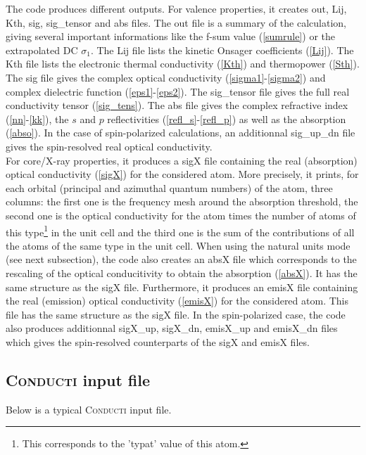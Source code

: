 \documentclass[a4,12pts]{extarticle}
\begin{document}
The code produces different outputs. For valence properties, it creates out, Lij, Kth, sig, sig\_tensor and abs files. The out file is a summary of the calculation, giving several important informations like the f-sum value (\ref{sumrule}) or the extrapolated DC $\sigma_1$. The Lij file lists the kinetic Onsager coefficients (\ref{Lij}). The Kth file lists the electronic thermal conductivity (\ref{Kth}) and thermopower (\ref{Sth}).
The sig file gives the complex optical conductivity (\ref{sigma1}-\ref{sigma2}) and complex dielectric function (\ref{eps1}-\ref{eps2}). The sig\_tensor file gives the full real conductivity tensor (\ref{sig_tens}). The abs file gives the complex refractive index (\ref{nn}-\ref{kk}), the $s$ and $p$ reflectivities (\ref{refl_s}-\ref{refl_p}) as well as the absorption (\ref{abso}). In the case of spin-polarized calculations, an additionnal sig\_up\_dn file gives the spin-resolved real optical conductivity.\\

For core/X-ray properties, it produces a sigX file containing the real (absorption) optical conductivity (\ref{sigX}) for the considered atom. More precisely, it prints, for each orbital (principal and azimuthal quantum numbers) of the atom, three columns: the first one is the frequency mesh around the absorption threshold, the second one is the optical conductivity for the atom times the number of atoms of this type\footnote{This corresponds to the 'typat' value of this atom.} in the unit cell and the third one is the sum of the contributions of all the atoms of the same type in the unit cell. When using the natural units mode (see next subsection), the code also creates an absX file which corresponds to the rescaling of the optical conducitivity to obtain the absorption (\ref{absX}). It has the same structure as the sigX file. 
Furthermore, it produces an emisX file containing the real (emission) optical conductivity (\ref{emisX}) for the considered atom. This file has the same structure as the sigX file.
In the spin-polarized case, the code also produces additionnal sigX\_up, sigX\_dn, emisX\_up and emisX\_dn files which gives the spin-resolved counterparts of the sigX and emisX files.

\subsection{\textsc{Conducti} input file}

Below is a typical \textsc{Conducti} input file.
\end{document}

